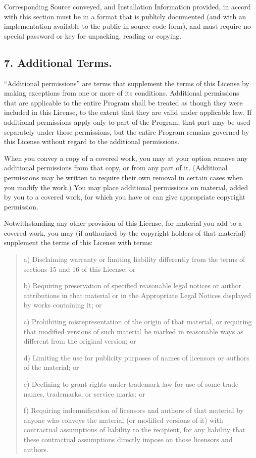 \documentclass[letterpaper,10pt,english]{sphinxmanual}
\begin{document}
\sphinxAtStartPar
Corresponding Source conveyed, and Installation Information provided,
in accord with this section must be in a format that is publicly
documented (and with an implementation available to the public in
source code form), and must require no special password or key for
unpacking, reading or copying.


\subsection{7. Additional Terms.}
\label{\detokenize{license:additional-terms}}
\sphinxAtStartPar
“Additional permissions” are terms that supplement the terms of this
License by making exceptions from one or more of its conditions.
Additional permissions that are applicable to the entire Program shall
be treated as though they were included in this License, to the extent
that they are valid under applicable law.  If additional permissions
apply only to part of the Program, that part may be used separately
under those permissions, but the entire Program remains governed by
this License without regard to the additional permissions.

\sphinxAtStartPar
When you convey a copy of a covered work, you may at your option
remove any additional permissions from that copy, or from any part of
it.  (Additional permissions may be written to require their own
removal in certain cases when you modify the work.)  You may place
additional permissions on material, added by you to a covered work,
for which you have or can give appropriate copyright permission.

\sphinxAtStartPar
Notwithstanding any other provision of this License, for material you
add to a covered work, you may (if authorized by the copyright holders of
that material) supplement the terms of this License with terms:
\begin{quote}

\sphinxAtStartPar
a) Disclaiming warranty or limiting liability differently from the
terms of sections 15 and 16 of this License; or

\sphinxAtStartPar
b) Requiring preservation of specified reasonable legal notices or
author attributions in that material or in the Appropriate Legal
Notices displayed by works containing it; or

\sphinxAtStartPar
c) Prohibiting misrepresentation of the origin of that material, or
requiring that modified versions of such material be marked in
reasonable ways as different from the original version; or

\sphinxAtStartPar
d) Limiting the use for publicity purposes of names of licensors or
authors of the material; or

\sphinxAtStartPar
e) Declining to grant rights under trademark law for use of some
trade names, trademarks, or service marks; or

\sphinxAtStartPar
f) Requiring indemnification of licensors and authors of that
material by anyone who conveys the material (or modified versions of
it) with contractual assumptions of liability to the recipient, for
any liability that these contractual assumptions directly impose on
those licensors and authors.
\end{quote}
\end{document}
